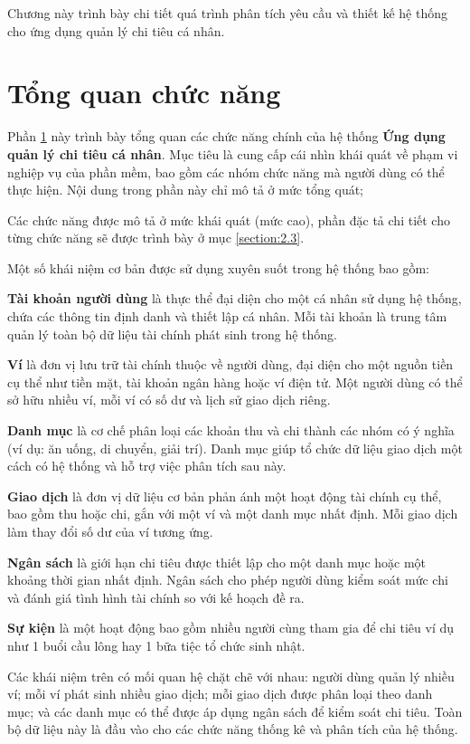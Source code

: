 \documentclass[../DoAn.tex]{subfiles}
\begin{document}
Chương này trình bày chi tiết quá trình phân tích yêu cầu và thiết kế hệ thống
cho ứng dụng quản lý chi tiêu cá nhân.

\section{Tổng quan chức năng}
\label{section:2.2}

Phần \ref{section:2.2} này trình bày tổng quan các chức năng chính của hệ thống \textbf{Ứng dụng quản lý chi tiêu cá nhân}.  
Mục tiêu là cung cấp cái nhìn khái quát về phạm vi nghiệp vụ của phần mềm, bao gồm các nhóm chức năng mà người dùng có thể thực hiện. Nội dung trong phần này chỉ mô tả ở mức tổng quát; 

Các chức năng được mô tả ở mức khái quát (mức cao), phần đặc tả chi tiết cho từng chức năng sẽ được trình bày ở mục \ref{section:2.3}.

Một số khái niệm cơ bản được sử dụng xuyên suốt trong hệ thống bao gồm:

\textbf{Tài khoản người dùng} là thực thể đại diện cho một cá nhân sử dụng hệ thống, chứa các thông tin định danh và thiết lập cá nhân. Mỗi tài khoản là trung tâm quản lý toàn bộ dữ liệu tài chính phát sinh trong hệ thống.

\textbf{Ví} là đơn vị lưu trữ tài chính thuộc về người dùng, đại diện cho một nguồn tiền cụ thể như tiền mặt, tài khoản ngân hàng hoặc ví điện tử. Một người dùng có thể sở hữu nhiều ví, mỗi ví có số dư và lịch sử giao dịch riêng.

\textbf{Danh mục} là cơ chế phân loại các khoản thu và chi thành các nhóm có ý nghĩa (ví dụ: ăn uống, di chuyển, giải trí). Danh mục giúp tổ chức dữ liệu giao dịch một cách có hệ thống và hỗ trợ việc phân tích sau này.

\textbf{Giao dịch} là đơn vị dữ liệu cơ bản phản ánh một hoạt động tài chính cụ thể, bao gồm thu hoặc chi, gắn với một ví và một danh mục nhất định. Mỗi giao dịch làm thay đổi số dư của ví tương ứng.

\textbf{Ngân sách} là giới hạn chi tiêu được thiết lập cho một danh mục hoặc một khoảng thời gian nhất định. Ngân sách cho phép người dùng kiểm soát mức chi và đánh giá tình hình tài chính so với kế hoạch đề ra.

\textbf{Sự kiện} là một hoạt động bao gồm nhiều người cùng tham gia để chi tiêu ví dụ như 1 buổi cầu lông hay 1 bữa tiệc tổ chức sinh nhật.

Các khái niệm trên có mối quan hệ chặt chẽ với nhau: người dùng quản lý nhiều ví; mỗi ví phát sinh nhiều giao dịch; mỗi giao dịch được phân loại theo danh mục; và các danh mục có thể được áp dụng ngân sách để kiểm soát chi tiêu. Toàn bộ dữ liệu này là đầu vào cho các chức năng thống kê và phân tích của hệ thống.
\end{document}
